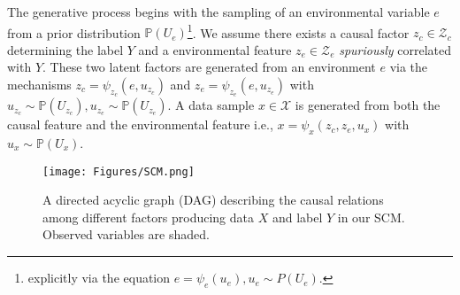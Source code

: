The generative process begins with the sampling of an environmental variable $e$ from a prior distribution $\mathbb{P}(U_e)$\footnote{explicitly via the equation $e = \psi_e(u_e), u_e \sim P(U_e)$.}. We assume there exists a causal factor $z_c\in\mathcal{Z}_c$ determining the label $Y$ and a environmental feature $z_e\in\mathcal{Z}_e$ \textit{spuriously} correlated with $Y$. 
These two latent factors are 
generated from an environment $e$ via the mechanisms $z_c = \psi_{z_c}(e, u_{z_c})$ and $z_e = \psi_{z_e}(e, u_{z_e})$ with $u_{z_c} \sim \mathbb{P}(U_{z_c}), u_{z_e} \sim \mathbb{P}(U_{z_e})$. A data sample $x\in \mathcal{X}$ is generated from both the causal feature and the environmental feature i.e., $x = \psi_{x}(z_c, z_e, u_{x})$ with $u_x \sim \mathbb{P}(U_x)$. 


\begin{figure}
    \centering
    \texttt{[image: Figures/SCM.png]}
    \caption{A directed acyclic graph (DAG) describing the causal relations among different factors producing data $X$ and label $Y$ in our SCM. Observed variables are shaded.}
    \label{fig:graph}
\end{figure}





